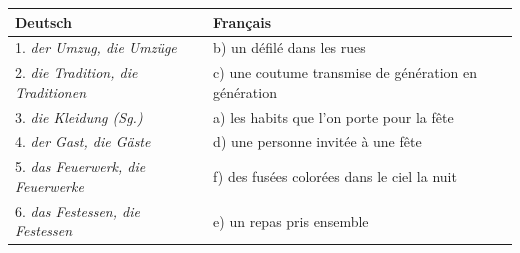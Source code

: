 \documentclass[11pt]{article}
\newcommand{\all}[1]{\ifmmode\text{\textit{#1}}\else\begingroup\selectlanguage{ngerman}\itshape #1\endgroup\fi}
\begin{document}
\begin{corrige}
\begin{center}
\begin{tabularx}{\linewidth}{|l|X|}
\hline
\rowcolor{popblueL} \textbf{Deutsch} & \textbf{Français} \\
\hline
1. \all{der Umzug, die Umzüge} & b) un défilé dans les rues \\
\hline
2. \all{die Tradition, die Traditionen} & c) une coutume transmise de génération en génération \\
\hline
3. \all{die Kleidung (Sg.)} & a) les habits que l'on porte pour la fête \\
\hline
4. \all{der Gast, die Gäste} & d) une personne invitée à une fête \\
\hline
5. \all{das Feuerwerk, die Feuerwerke} & f) des fusées colorées dans le ciel la nuit \\
\hline
6. \all{das Festessen, die Festessen} & e) un repas pris ensemble \\
\hline
\end{tabularx}
\end{center}
\end{corrige}
\end{document}

